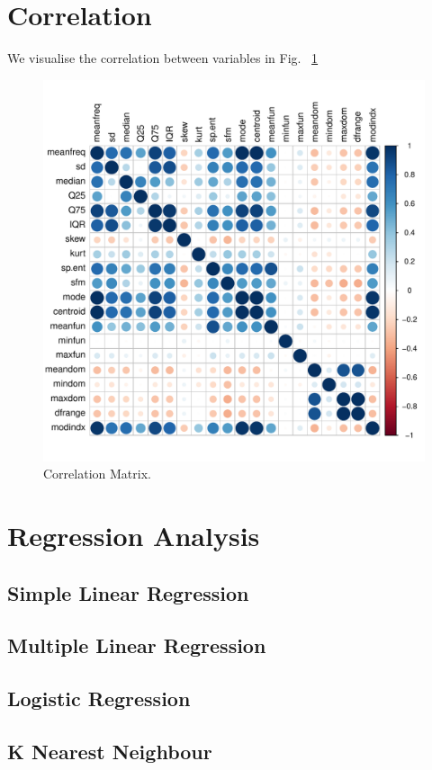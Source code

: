 \documentclass{article}
\begin{document}
	
	\section{Correlation}
	We visualise the correlation between variables in Fig. ~\ref{correlation_matrix}
	\begin{figure}
		\centering
		\includegraphics[width=\textwidth]{graphs/correlation_matrix.pdf}
		\caption{Correlation Matrix.}
		\label{correlation_matrix}
	\end{figure}
	
	\section{Regression Analysis}
	\subsection{Simple Linear Regression}
	\subsection{Multiple Linear Regression}
	\subsection{Logistic Regression}
	\subsection{K Nearest Neighbour}
	
\end{document}
